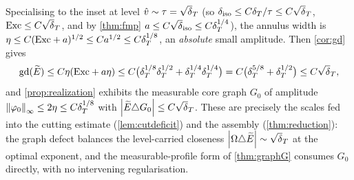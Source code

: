 \begin{remark}\label{rem:fold-scales}
Specialising to the inset at level $\hat v\sim\tau=\sqrt\dT$ (so
$\diso\le C\dT/\tau\le C\sqrt\dT$, $\Exc\le C\sqrt\dT$, and by \cref{thm:fmp}
$a\le C\sqrt\diso\le C\dT^{1/4}$), the annulus width is $\eta\le
C(\mathrm{Exc}+a)^{1/2}\le Ca^{1/2}\le C\delta_T^{1/8}$, an \emph{absolute} small
amplitude. Then \cref{cor:gd} gives
\[
   \gd(\Etil)\le C\eta(\Exc+a\eta)
   \le C\bigl(\dT^{1/8}\dT^{1/2}+\dT^{1/4}\dT^{1/4}\bigr)
   =C\bigl(\dT^{5/8}+\dT^{1/2}\bigr)\le C\sqrt\dT,
\]
and \cref{prop:realization} exhibits the measurable core graph $G_0$ of
amplitude $\left\lVert\varphi_0\right\rVert_\infty\le2\eta\le C\delta_T^{1/8}$ with
$\abs{\Etil\triangle G_0}\le C\sqrt\dT$. These are precisely the scales fed
into the cutting estimate (\cref{lem:cutdeficit}) and the assembly
(\cref{thm:reduction}): the graph defect balances the level-carried closeness
$\abs{\Om\triangle\Etil}\sim\sqrt\dT$ at the optimal exponent, and the
measurable-profile form of \cref{thm:graphG} consumes $G_0$ directly, with no
intervening regularisation.
\end{remark}
